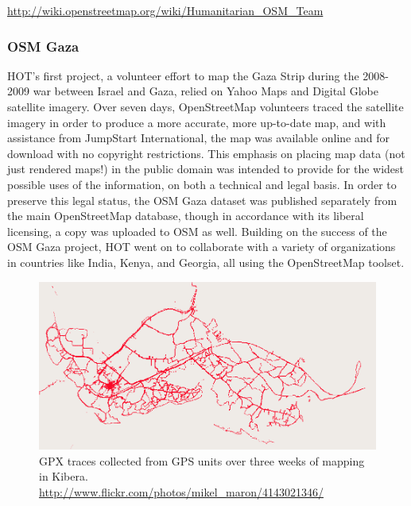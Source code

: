 \documentclass[11pt]{report}
\begin{document}
\url{http://wiki.openstreetmap.org/wiki/Humanitarian_OSM_Team}

\subsubsection{OSM Gaza}

HOT's first project, a volunteer effort to map the Gaza Strip during the 2008-2009 war between Israel and Gaza, relied on Yahoo Maps and Digital Globe satellite imagery. Over seven days, OpenStreetMap volunteers traced the satellite imagery in order to produce a more accurate, more up-to-date map, and with assistance from JumpStart International, the map was available online and for download with no copyright restrictions. This emphasis on placing map data (not just rendered maps!) in the public domain was intended to provide for the widest possible uses of the information, on both a technical and legal basis. In order to preserve this legal status, the OSM Gaza dataset was published separately from the main OpenStreetMap database, though in accordance with its liberal licensing, a copy was uploaded to OSM as well. Building on the success of the OSM Gaza project, HOT went on to collaborate with a variety of organizations in countries like India, Kenya, and Georgia, all using the OpenStreetMap toolset. 

\begin{figure}[h]
  \begin{center}
    \includegraphics[width=1\textwidth]{images/kibera-gpx.png}
    GPX traces collected from GPS units over three weeks of mapping in Kibera. \url{http://www.flickr.com/photos/mikel_maron/4143021346/}
  \end{center}
\end{figure}
\end{document}
